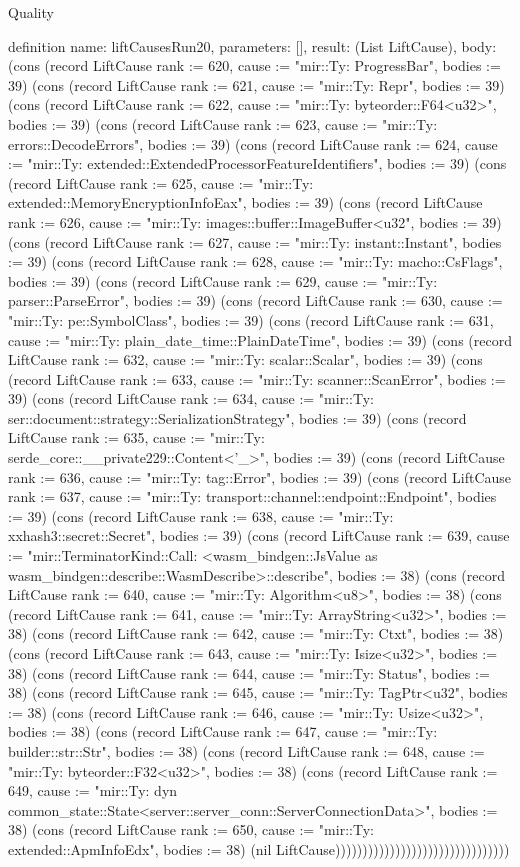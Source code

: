 \begin{lexlean}{Quality}
\begin{semanticmodule}
definition{
  name: liftCausesRun20,
  parameters: [],
  result: (List LiftCause),
  body: (cons (record LiftCause {rank := 620, cause := "mir::Ty: ProgressBar", bodies := 39}) (cons (record LiftCause {rank := 621, cause := "mir::Ty: Repr", bodies := 39}) (cons (record LiftCause {rank := 622, cause := "mir::Ty: byteorder::F64<u32>", bodies := 39}) (cons (record LiftCause {rank := 623, cause := "mir::Ty: errors::DecodeErrors", bodies := 39}) (cons (record LiftCause {rank := 624, cause := "mir::Ty: extended::ExtendedProcessorFeatureIdentifiers", bodies := 39}) (cons (record LiftCause {rank := 625, cause := "mir::Ty: extended::MemoryEncryptionInfoEax", bodies := 39}) (cons (record LiftCause {rank := 626, cause := "mir::Ty: images::buffer::ImageBuffer<u32", bodies := 39}) (cons (record LiftCause {rank := 627, cause := "mir::Ty: instant::Instant", bodies := 39}) (cons (record LiftCause {rank := 628, cause := "mir::Ty: macho::CsFlags", bodies := 39}) (cons (record LiftCause {rank := 629, cause := "mir::Ty: parser::ParseError", bodies := 39}) (cons (record LiftCause {rank := 630, cause := "mir::Ty: pe::SymbolClass", bodies := 39}) (cons (record LiftCause {rank := 631, cause := "mir::Ty: plain_date_time::PlainDateTime", bodies := 39}) (cons (record LiftCause {rank := 632, cause := "mir::Ty: scalar::Scalar", bodies := 39}) (cons (record LiftCause {rank := 633, cause := "mir::Ty: scanner::ScanError", bodies := 39}) (cons (record LiftCause {rank := 634, cause := "mir::Ty: ser::document::strategy::SerializationStrategy", bodies := 39}) (cons (record LiftCause {rank := 635, cause := "mir::Ty: serde_core::__private229::Content<'_>", bodies := 39}) (cons (record LiftCause {rank := 636, cause := "mir::Ty: tag::Error", bodies := 39}) (cons (record LiftCause {rank := 637, cause := "mir::Ty: transport::channel::endpoint::Endpoint", bodies := 39}) (cons (record LiftCause {rank := 638, cause := "mir::Ty: xxhash3::secret::Secret", bodies := 39}) (cons (record LiftCause {rank := 639, cause := "mir::TerminatorKind::Call: <wasm_bindgen::JsValue as wasm_bindgen::describe::WasmDescribe>::describe", bodies := 38}) (cons (record LiftCause {rank := 640, cause := "mir::Ty: Algorithm<u8>", bodies := 38}) (cons (record LiftCause {rank := 641, cause := "mir::Ty: ArrayString<u32>", bodies := 38}) (cons (record LiftCause {rank := 642, cause := "mir::Ty: Ctxt", bodies := 38}) (cons (record LiftCause {rank := 643, cause := "mir::Ty: Isize<u32>", bodies := 38}) (cons (record LiftCause {rank := 644, cause := "mir::Ty: Status", bodies := 38}) (cons (record LiftCause {rank := 645, cause := "mir::Ty: TagPtr<u32", bodies := 38}) (cons (record LiftCause {rank := 646, cause := "mir::Ty: Usize<u32>", bodies := 38}) (cons (record LiftCause {rank := 647, cause := "mir::Ty: builder::str::Str", bodies := 38}) (cons (record LiftCause {rank := 648, cause := "mir::Ty: byteorder::F32<u32>", bodies := 38}) (cons (record LiftCause {rank := 649, cause := "mir::Ty: dyn common_state::State<server::server_conn::ServerConnectionData>", bodies := 38}) (cons (record LiftCause {rank := 650, cause := "mir::Ty: extended::ApmInfoEdx", bodies := 38}) (nil LiftCause))))))))))))))))))))))))))))))))
}


\end{semanticmodule}
\end{lexlean}
